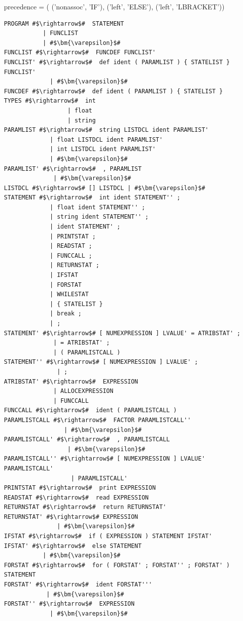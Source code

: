 \documentclass[
	12pt,				%
	openright,			%
	twoside,			%
	a4paper,			%
	english,			%
	french,				%
	spanish,			%
	brazil				%
	]{abntex2}
\begin{document}
\begin{python}
precedence = (
('nonassoc', 'IF'), 
('left', 'ELSE'),
('left', 'LBRACKET')) 
\end{python} 
\begin{lstlisting}[escapechar=\#]
PROGRAM #$\rightarrow$#  STATEMENT
           | FUNCLIST
           | #$\bm{\varepsilon}$#
FUNCLIST #$\rightarrow$#  FUNCDEF FUNCLIST'
FUNCLIST' #$\rightarrow$#  def ident ( PARAMLIST ) { STATELIST } FUNCLIST'
             | #$\bm{\varepsilon}$#
FUNCDEF #$\rightarrow$#  def ident ( PARAMLIST ) { STATELIST }
TYPES #$\rightarrow$#  int
                  | float
                  | string
PARAMLIST #$\rightarrow$#  string LISTDCL ident PARAMLIST'
             | float LISTDCL ident PARAMLIST'
             | int LISTDCL ident PARAMLIST'
             | #$\bm{\varepsilon}$#
PARAMLIST' #$\rightarrow$#  , PARAMLIST
              | #$\bm{\varepsilon}$#
LISTDCL #$\rightarrow$# [] LISTDCL | #$\bm{\varepsilon}$#
STATEMENT #$\rightarrow$#  int ident STATEMENT'' ;
             | float ident STATEMENT'' ;
             | string ident STATEMENT'' ;
             | ident STATEMENT' ;
             | PRINTSTAT ;
             | READSTAT ;
             | FUNCCALL ;
             | RETURNSTAT ;
             | IFSTAT
             | FORSTAT
             | WHILESTAT
             | { STATELIST }
             | break ;
             | ;
STATEMENT' #$\rightarrow$# [ NUMEXPRESSION ] LVALUE' = ATRIBSTAT' ;
              | = ATRIBSTAT' ;
              | ( PARAMLISTCALL )
STATEMENT'' #$\rightarrow$# [ NUMEXPRESSION ] LVALUE' ;
               | ;
ATRIBSTAT' #$\rightarrow$#  EXPRESSION
              | ALLOCEXPRESSION
              | FUNCCALL
FUNCCALL #$\rightarrow$#  ident ( PARAMLISTCALL )
PARAMLISTCALL #$\rightarrow$#  FACTOR PARAMLISTCALL''
                 | #$\bm{\varepsilon}$#
PARAMLISTCALL' #$\rightarrow$#  , PARAMLISTCALL
                  | #$\bm{\varepsilon}$#
PARAMLISTCALL'' #$\rightarrow$# [ NUMEXPRESSION ] LVALUE' PARAMLISTCALL'
                   | PARAMLISTCALL'
PRINTSTAT #$\rightarrow$#  print EXPRESSION
READSTAT #$\rightarrow$#  read EXPRESSION
RETURNSTAT #$\rightarrow$#  return RETURNSTAT'
RETURNSTAT' #$\rightarrow$# EXPRESSION
               | #$\bm{\varepsilon}$#
IFSTAT #$\rightarrow$#  if ( EXPRESSION ) STATEMENT IFSTAT'
IFSTAT' #$\rightarrow$#  else STATEMENT
           | #$\bm{\varepsilon}$#
FORSTAT #$\rightarrow$#  for ( FORSTAT' ; FORSTAT'' ; FORSTAT' ) STATEMENT
FORSTAT' #$\rightarrow$#  ident FORSTAT'''
            | #$\bm{\varepsilon}$#
FORSTAT'' #$\rightarrow$#  EXPRESSION
             | #$\bm{\varepsilon}$#

\end{lstlisting}
\end{document}
